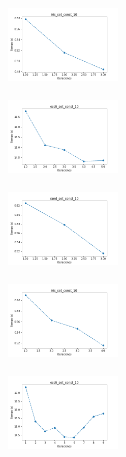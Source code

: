 \newpage

\begin{figure}[H]    
    \centering
    \begin{subfigure}
        \centering
        \includegraphics[width=0.32\textwidth]{img/copkm2/iris_set_const_10_949004259_time.png}
    \end{subfigure}
    \hfill
    \begin{subfigure}
        \centering
        \includegraphics[width=0.32\textwidth]{img/copkm2/ecoli_set_const_10_949004259_time.png}
    \end{subfigure}
    \hfill
    \begin{subfigure}
        \centering
        \includegraphics[width=0.32\textwidth]{img/copkm2/rand_set_const_10_949004259_time.png}
    \end{subfigure}
    \hfill
    \begin{subfigure}
        \centering
        \includegraphics[width=0.32\textwidth]{img/copkm2/iris_set_const_10_589741062_time.png}
    \end{subfigure}
    \hfill
    \begin{subfigure}
        \centering
        \includegraphics[width=0.32\textwidth]{img/copkm2/ecoli_set_const_10_589741062_time.png}

\end{subfigure}
\end{figure}
